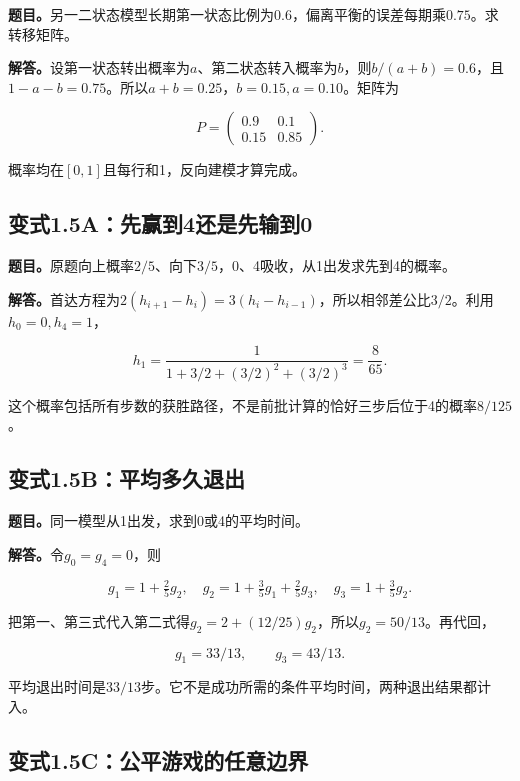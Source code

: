 \documentclass[
  11pt,a4paper,UTF8,fontset=fandol]{ctexart}
\begin{document}
\textbf{题目。}另一二状态模型长期第一状态比例为\(0.6\)，偏离平衡的误差每期乘\(0.75\)。求转移矩阵。

\textbf{解答。}设第一状态转出概率为\(a\)、第二状态转入概率为\(b\)，则\(b/(a+b)=0.6\)，且\(1-a-b=0.75\)。所以\(a+b=0.25\)，\(b=0.15,a=0.10\)。矩阵为

\[\boxed{P=\begin{pmatrix}0.9&0.1\\0.15&0.85\end{pmatrix}.}\]

概率均在\([0,1]\)且每行和1，反向建模才算完成。

\subsection{变式1.5A：先赢到4还是先输到0}\label{ux53d8ux5f0f1.5aux5148ux8d62ux52304ux8fd8ux662fux5148ux8f93ux52300}

\textbf{题目。}原题向上概率\(2/5\)、向下\(3/5\)，0、4吸收，从1出发求先到4的概率。

\textbf{解答。}首达方程为\(2(h_{i+1}-h_i)=3(h_i-h_{i-1})\)，所以相邻差公比\(3/2\)。利用\(h_0=0,h_4=1\)，

\[\boxed{h_1=\frac1{1+3/2+(3/2)^2+(3/2)^3}=\frac8{65}.}\]

这个概率包括所有步数的获胜路径，不是前批计算的恰好三步后位于4的概率\(8/125\)。

\subsection{变式1.5B：平均多久退出}\label{ux53d8ux5f0f1.5bux5e73ux5747ux591aux4e45ux9000ux51fa}

\textbf{题目。}同一模型从1出发，求到0或4的平均时间。

\textbf{解答。}令\(g_0=g_4=0\)，则

\[g_1=1+\tfrac25g_2,\quad
g_2=1+\tfrac35g_1+\tfrac25g_3,\quad
g_3=1+\tfrac35g_2.\]

把第一、第三式代入第二式得\(g_2=2+(12/25)g_2\)，所以\(g_2=50/13\)。再代回，

\[\boxed{g_1=33/13,\qquad g_3=43/13.}\]

平均退出时间是\(33/13\)步。它不是成功所需的条件平均时间，两种退出结果都计入。

\subsection{变式1.5C：公平游戏的任意边界}\label{ux53d8ux5f0f1.5cux516cux5e73ux6e38ux620fux7684ux4efbux610fux8fb9ux754c}
\end{document}
